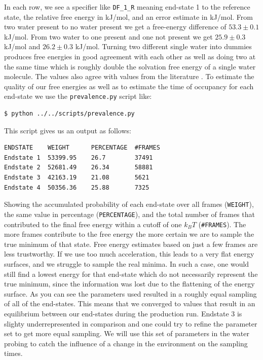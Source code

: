 In each row, we see a specifier like \texttt{DF\_1\_R} meaning end-state 1 to the reference state, the relative free energy in kJ/mol, and an error estimate in kJ/mol. From two water present to no water present we get a free-energy difference of $53.3 \pm 0.1$ kJ/mol. From two water to one present and one not present we get $25.9 \pm 0.3$ kJ/mol and $26.2 \pm 0.3$ kJ/mol. Turning two different single water into dummies produces free energies in good agreement with each other as well as doing two at the same time which is roughly double the solvation free energy of a single water molecule. The values also agree with values from the literature \cite{gracia1}. To estimate the quality of our free energies as well as to estimate the time of occupancy for each end-state we use the \texttt{prevalence.py} script like:

\begin{lstlisting}
$ python ../../scripts/prevalence.py
\end{lstlisting}

This script gives us an output as follows: 

\begin{lstlisting}
ENDSTATE    WEIGHT      PERCENTAGE  #FRAMES
Endstate 1  53399.95    26.7        37491
Endstate 2  52681.49    26.34       58881
Endstate 3  42163.19    21.08       5621
Endstate 4  50356.36    25.88       7325
\end{lstlisting}

Showing the accumulated probability of each end-state over all frames (\texttt{WEIGHT}), the same value in percentage (\texttt{PERCENTAGE}), and the total number of frames that contributed to the final free energy within a cutoff of one $k_BT$ (\texttt{\#FRAMES}). The more frames contribute to the free energy the more certain we are to sample the true minimum of that state. Free energy estimates based on just a few frames are less trustworthy. If we use too much acceleration, this leads to a very flat energy surfaces, and we struggle to sample the real minima. In such a case, one would still find a lowest energy for that end-state which do not necessarily represent the true minimum, since the information was lost due to the flattening of the energy surface. 
As you can see the parameters used resulted in a roughly equal sampling of all of the end-states. This means that we converged to values that result in an equilibrium between our end-states during the production run. Endstate 3 is slighty underrepresented in comparison and one could try to refine the parameter set to get more equal sampling. We will use this set of parameters in the water probing to catch the influence of a change in the environment on the sampling times.

